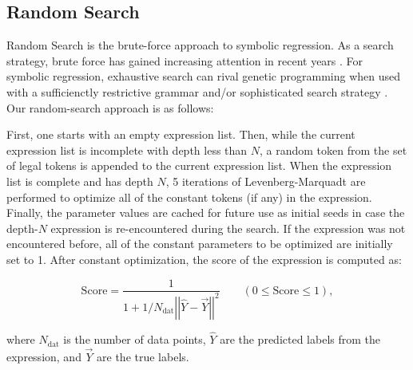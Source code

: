 \documentclass[runningheads]{llncs}
\begin{document}
\subsection{Random Search}\label{subsec:RandomSearch}

Random Search is the brute-force approach to symbolic regression.  As a search strategy, brute force has gained increasing attention in recent years \cite{Heule2017TheSO}. For symbolic regression, exhaustive search can rival genetic programming when used with a sufficienctly restrictive grammar \cite{Kammerer2020} and/or sophisticated search strategy \cite{udrescu2020ai}.
Our random-search approach is as follows:
\par First, one starts with an empty expression list. Then, while the current expression list is incomplete with depth less than $N$, a random token from the set of legal tokens is appended to the current expression list. When the expression list is complete and has depth $N$, 5 iterations of Levenberg-Marquadt are performed to optimize all of the constant tokens (if any) in the expression. Finally, the parameter values are cached for future use as initial seeds in case the depth-$N$ expression is re-encountered during the search. If the expression was not encountered before, all of the constant parameters to be optimized are initially set to 1. After constant optimization, the score of the expression is computed as:

\begin{equation}
\mathrm{Score} = \frac{1}{1+ 1/N_{\mathrm{dat}}\left|\left|\hat{Y}-\vec{Y}\right|\right|^2} \qquad  (0 \leq \mathrm{Score} \leq 1), \label{eq:score_formula}
\end{equation}

where $N_{\mathrm{dat}}$ is the number of data points, $\hat{Y}$ are the predicted labels from the expression, and $\vec{Y}$ are the true labels.
\end{document}

